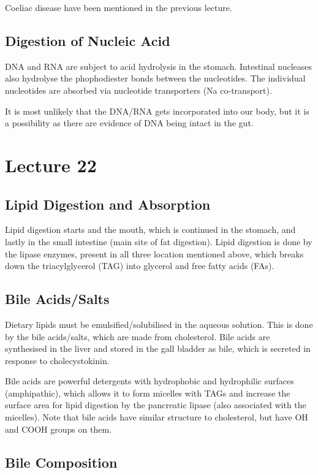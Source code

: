 \documentclass[a4paper, 12pt]{report}
\newcommand{\mychapter}[2]{
    \setcounter{chapter}{#1}
    \setcounter{section}{0}
    \chapter*{#2}
    \addcontentsline{toc}{chapter}{#2}
}
\begin{document}
Coeliac disease have been mentioned in the previous lecture.

\section{Digestion of Nucleic Acid}

DNA and RNA are subject to acid hydrolysis in the stomach.
Intestinal nucleases also hydrolyse the phophodiester bonds between the nucleotides.
The individual nucleotides are absorbed via nucleotide transporters (Na co-transport).

It is most unlikely that the DNA/RNA gets incorporated into our body, but it is a possibility as there are evidence of DNA being intact in the gut.

\mychapter{22}{Lecture 22}

\section{Lipid Digestion and Absorption}

Lipid digestion starts and the mouth, which is continued in the stomach, and lastly in the small intestine (main site of fat digestion).
Lipid digestion is done by the lipase enzymes, present in all three location mentioned above, which breaks down the triacylglycerol (TAG) into glycerol and free fatty acids (FAs).

\section{Bile Acids/Salts}

Dietary lipids must be emulsified/solubilised in the aqueous solution.
This is done by the bile acids/salts, which are made from cholesterol.
Bile acids are synthesised in the liver and stored in the gall bladder as bile, which is secreted in response to cholecystokinin.

Bile acids are powerful detergents with hydrophobic  and hydrophilic surfaces (amphipathic), which allows it to form micelles with TAGs and increase the surface area for lipid digestion by the pancreatic lipase (also associated with the micelles).
Note that bile acids have similar structure to cholesterol, but have OH and COOH groups on them.

\section{Bile Composition}
\end{document}
